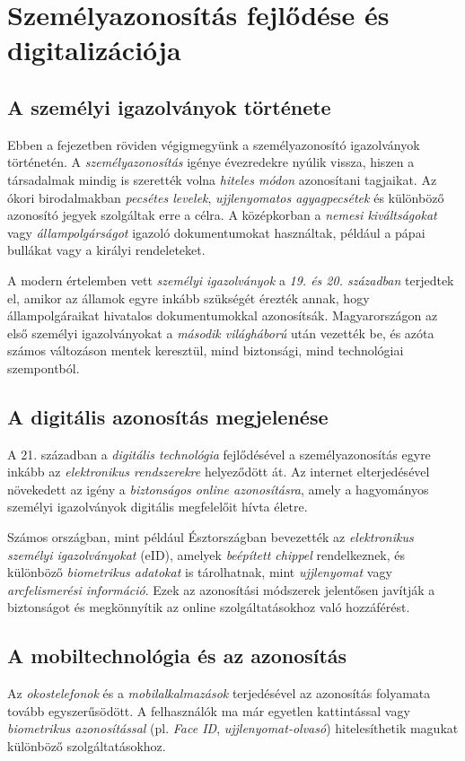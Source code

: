 \documentclass[
]{thesis-ekf}
\theoremstyle{definition}
\theoremstyle{remark}
\begin{document}
	\chapter{Személyazonosítás fejlődése és digitalizációja}
	\section{A személyi igazolványok története}
	Ebben a fejezetben röviden végigmegyünk a személyazonosító igazolványok történetén. A \emph{személyazonosítás} igénye évezredekre nyúlik vissza, hiszen a társadalmak mindig is szerették volna \emph{hiteles módon} azonosítani tagjaikat. Az ókori birodalmakban \emph{pecsétes levelek}, \emph{ujjlenyomatos agyagpecsétek} és különböző azonosító jegyek szolgáltak erre a célra. A középkorban a \emph{nemesi kiváltságokat} vagy \emph{állampolgárságot} igazoló dokumentumokat használtak, például a pápai bullákat vagy a királyi rendeleteket. \cite{okoriAzonositas, kozepkorAzonositas}
	
	A modern értelemben vett \emph{személyi igazolványok} a \emph{19. és 20. században} terjedtek el, amikor az államok egyre inkább szükségét érezték annak, hogy állampolgáraikat hivatalos dokumentumokkal azonosítsák. Magyarországon az első személyi igazolványokat a \emph{második világháború} után vezették be, és azóta számos változáson mentek keresztül, mind biztonsági, mind technológiai szempontból. \cite{magyarAzonositas}
	
	\section{A digitális azonosítás megjelenése}
	A 21. században a \emph{digitális technológia} fejlődésével a személyazonosítás egyre inkább az \emph{elektronikus rendszerekre} helyeződött át. Az internet elterjedésével növekedett az igény a \emph{biztonságos online azonosításra}, amely a hagyományos személyi igazolványok digitális megfelelőit hívta életre.
	
	Számos országban, mint például Észtországban bevezették az \emph{elektronikus személyi igazolványokat} (eID), amelyek \emph{beépített chippel} rendelkeznek, és különböző \emph{biometrikus adatokat} is tárolhatnak, mint \emph{ujjlenyomat} vagy \emph{arcfelismerési információ}. Ezek az azonosítási módszerek jelentősen javítják a biztonságot és megkönnyítik az online szolgáltatásokhoz való hozzáférést. \cite{magyarAzonositas}
	
	\section{A mobiltechnológia és az azonosítás}
	Az \emph{okostelefonok} és a \emph{mobilalkalmazások} terjedésével az azonosítás folyamata tovább egyszerűsödött. A felhasználók ma már egyetlen kattintással vagy \emph{biometrikus azonosítással} (pl. \emph{Face ID}, \emph{ujjlenyomat-olvasó}) hitelesíthetik magukat különböző szolgáltatásokhoz.
	
\end{document}

